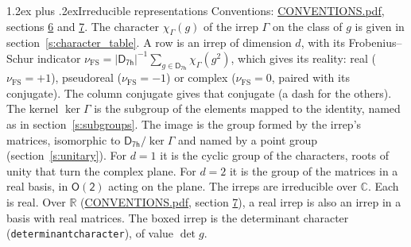 \documentclass[10pt,a4paper]{article}
\makeatletter
\renewcommand\section{\@startsection{section}{1}{\z@}{-3ex plus -1ex minus -.2ex}%
  {1.2ex plus .2ex}{\normalfont\large\sffamily\bfseries\color{parttitle}}}
\numberwithin{equation}{section}
\newcommand{\grp}[1]{\mathsf{#1}}
\newcommand{\irchar}[1]{\chi_{#1}}
\newcommand{\fsind}{\nu_{\mathrm{FS}}}
\makeatother
\begin{document}
\section{Irreducible representations}\label{s:irreps}
Conventions: \href{../../CONVENTIONS.pdf}{CONVENTIONS.pdf}, sections \href{../../CONVENTIONS.pdf\#conv.6}{6} and \href{../../CONVENTIONS.pdf\#conv.7}{7}.
\leavevmode\label{n:function.character}\label{n:irrep.Gamma}The character $\irchar{\Gamma}(g)$ of the irrep $\Gamma$ on the class of $g$ is given in section~\ref{s:character_table}.
\leavevmode\label{n:index.dimension}\label{n:index.frobenius}\label{n:head.irrep}\label{n:head.reality}A row is an irrep of dimension $d$, with its Frobenius--Schur indicator $\fsind = |\grp{D_{7h}}|^{-1}\allowbreak\sum_{g\in\grp{D_{7h}}}\irchar{\Gamma}(g^2)$, which gives its reality: real ($\fsind = +1$), pseudoreal ($\fsind = -1$) or complex ($\fsind = 0$, paired with its conjugate). \label{n:head.conjugate}The column conjugate gives that conjugate (a dash for the others). \label{n:head.kernel}The kernel $\ker\Gamma$ is the subgroup of the elements mapped to the identity, named as in section~\ref{s:subgroups}. \label{n:head.image}The image is the group formed by the irrep's matrices, isomorphic to $\grp{D_{7h}}/\ker\Gamma$ and named by a point group (section~\ref{s:unitary}). For $d = 1$ it is the cyclic group of the characters, roots of unity that turn the complex plane. For $d = 2$ it is the group of the matrices in a real basis, in $\grp{O(2)}$ acting on the plane. The irreps are irreducible over $\mathbb{C}$. Each is real. Over $\mathbb{R}$ (\href{../../CONVENTIONS.pdf}{CONVENTIONS.pdf}, section \href{../../CONVENTIONS.pdf\#conv.7}{7}), a real irrep is also an irrep in a basis with real matrices. \label{n:mark.determinant}The boxed irrep is the determinant character (\texttt{determinantcharacter}), of value $\det g$.
\setlength{\emergencystretch}{2em}\par\setlength{\emergencystretch}{0pt}
\end{document}
